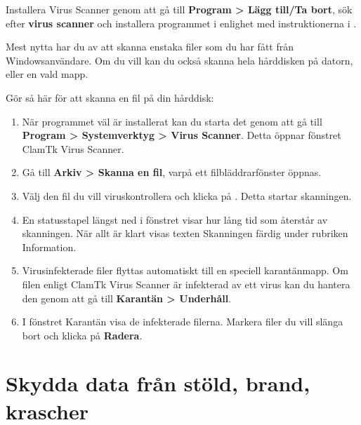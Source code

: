 \documentclass[a4paper,final]{memoir} %
\begin{document}

Installera Virus Scanner genom att gå till \textbf{Program \textgreater{} Lägg till/Ta bort}, sök efter \textbf{virus scanner} och installera programmet i enlighet med instruktionerna i .

Mest nytta har du av att skanna enstaka filer som du har fått från Windowsanvändare. Om du vill kan du också skanna hela hårddisken på datorn, eller en vald mapp. 

Gör så här för att skanna en fil på din hårddisk:

\begin{enumerate}

\item När programmet väl är installerat kan du starta det genom att gå till \textbf{Program \textgreater{} Systemverktyg \textgreater{} Virus Scanner}. Detta öppnar fönstret ClamTk Virus Scanner.

\item Gå till \textbf{Arkiv \textgreater{} Skanna en fil}, varpå ett filbläddrarfönster öppnas.

\item Välj den fil du vill viruskontrollera och klicka på \xok{}. Detta startar skanningen.

\item En statusstapel längst ned i fönstret visar hur lång tid som återstår av skanningen. När allt är klart visas texten Skanningen färdig under rubriken Information. 

\item Virusinfekterade filer flyttas automatiskt till en speciell karantänmapp. Om filen enligt ClamTk Virus Scanner är infekterad av ett virus kan du hantera den genom att gå till \textbf{Karantän \textgreater{} Underhåll}. 

\item I fönstret Karantän visa de infekterade filerna. Markera filer du vill slänga bort och klicka på \textbf{Radera}.

\end{enumerate}


\section{Skydda data från stöld, brand, krascher}\label{sec:backuprutiner}
\end{document}
